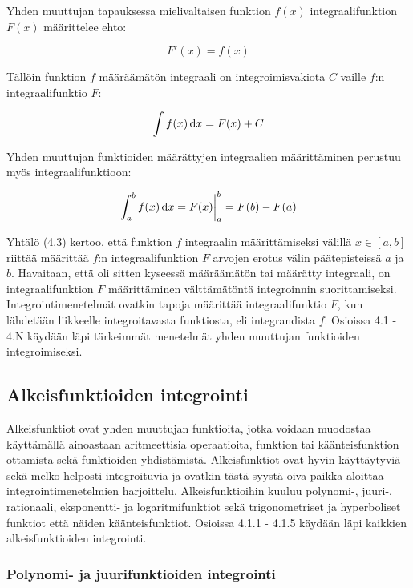 \documentclass[../integrointiopas.tex]{subfiles}
\begin{document}
	Yhden muuttujan tapauksessa mielivaltaisen funktion $f(x)$ integraalifunktion $F(x)$ määrittelee ehto:
	
	\begin{equation}
		F'(x) = f(x)
	\end{equation} 
	
	Tällöin funktion $f$ määräämätön integraali on integroimisvakiota $C$ vaille $f$:n integraalifunktio $F$:
	
	\begin{equation}
		\int f(x)\odif{x} = F(x) + C
	\end{equation} 
	
	Yhden muuttujan funktioiden määrättyjen integraalien määrittäminen perustuu myös integraalifunktioon:
	
	\begin{equation}
		\int_{a}^{b}f(x)\odif{x} = F(x)\bigg|_a^{b} = F(b) - F(a)
	\end{equation}
	
	Yhtälö (4.3) kertoo, että funktion $f$ integraalin määrittämiseksi välillä $x\in[a, b]$ riittää määrittää $f$:n integraalifunktion $F$ arvojen erotus välin päätepisteissä $a$ ja $b$. Havaitaan, että oli sitten kyseessä määräämätön tai määrätty integraali, on integraalifunktion $F$ määrittäminen välttämätöntä integroinnin suorittamiseksi. Integrointimenetelmät ovatkin tapoja määrittää integraalifunktio $F$, kun lähdetään liikkeelle integroitavasta funktiosta, eli integrandista $f$. Osioissa 4.1 - 4.N käydään läpi tärkeimmät menetelmät yhden muuttujan funktioiden integroimiseksi. 
	
	\subsection{Alkeisfunktioiden integrointi}
	
	Alkeisfunktiot ovat yhden muuttujan funktioita, jotka voidaan muodostaa käyttämällä ainoastaan aritmeettisia operaatioita, funktion tai käänteisfunktion ottamista sekä funktioiden yhdistämistä. Alkeisfunktiot ovat hyvin käyttäytyviä sekä melko helposti integroituvia ja ovatkin tästä syystä oiva paikka aloittaa integrointimenetelmien harjoittelu. Alkeisfunktioihin kuuluu polynomi-, juuri-, rationaali, eksponentti- ja logaritmifunktiot sekä trigonometriset ja hyperboliset funktiot että näiden käänteisfunktiot. Osioissa 4.1.1 - 4.1.5 käydään läpi kaikkien alkeisfunktioiden integrointi.
	
	\subsubsection{Polynomi- ja juurifunktioiden integrointi}
	
\end{document}
